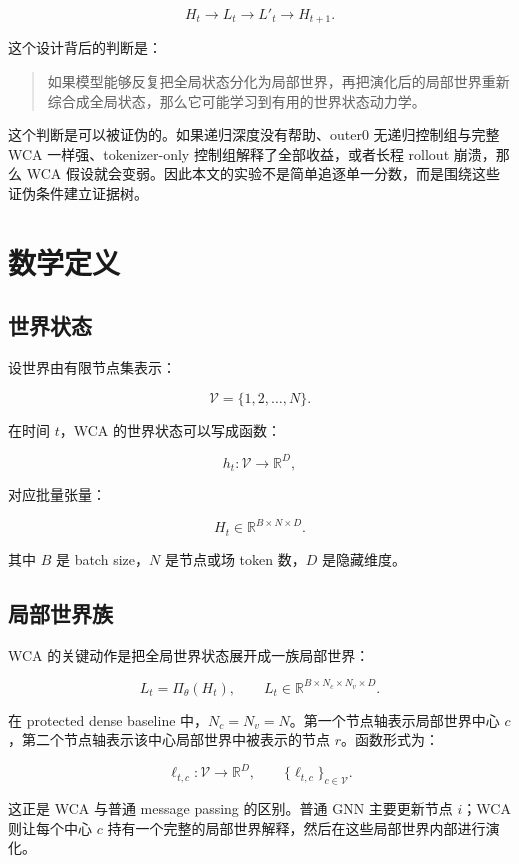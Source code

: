 \documentclass[11pt]{article}
\newcommand{\R}{\mathbb{R}}
\newcommand{\V}{\mathcal{V}}
\begin{document}
\[
H_t \longrightarrow L_t \longrightarrow L'_t \longrightarrow H_{t+1}.
\]

这个设计背后的判断是：

\begin{quote}
如果模型能够反复把全局状态分化为局部世界，再把演化后的局部世界重新综合成全局状态，那么它可能学习到有用的世界状态动力学。
\end{quote}

这个判断是可以被证伪的。如果递归深度没有帮助、outer0 无递归控制组与完整 WCA 一样强、tokenizer-only 控制组解释了全部收益，或者长程 rollout 崩溃，那么 WCA 假设就会变弱。因此本文的实验不是简单追逐单一分数，而是围绕这些证伪条件建立证据树。

\section{数学定义}

\subsection{世界状态}

设世界由有限节点集表示：

\[
\V = \{1,2,\ldots,N\}.
\]

在时间 $t$，WCA 的世界状态可以写成函数：

\[
h_t:\V \rightarrow \R^D,
\]

对应批量张量：

\[
H_t \in \R^{B \times N \times D}.
\]

其中 $B$ 是 batch size，$N$ 是节点或场 token 数，$D$ 是隐藏维度。

\subsection{局部世界族}

WCA 的关键动作是把全局世界状态展开成一族局部世界：

\[
L_t = \Pi_\theta(H_t), \qquad
L_t \in \R^{B \times N_c \times N_v \times D}.
\]

在 protected dense baseline 中，$N_c=N_v=N$。第一个节点轴表示局部世界中心 $c$，第二个节点轴表示该中心局部世界中被表示的节点 $r$。函数形式为：

\[
\ell_{t,c}: \V \rightarrow \R^D,
\qquad
\{\ell_{t,c}\}_{c\in \V}.
\]

这正是 WCA 与普通 message passing 的区别。普通 GNN 主要更新节点 $i$；WCA 则让每个中心 $c$ 持有一个完整的局部世界解释，然后在这些局部世界内部进行演化。
\end{document}
